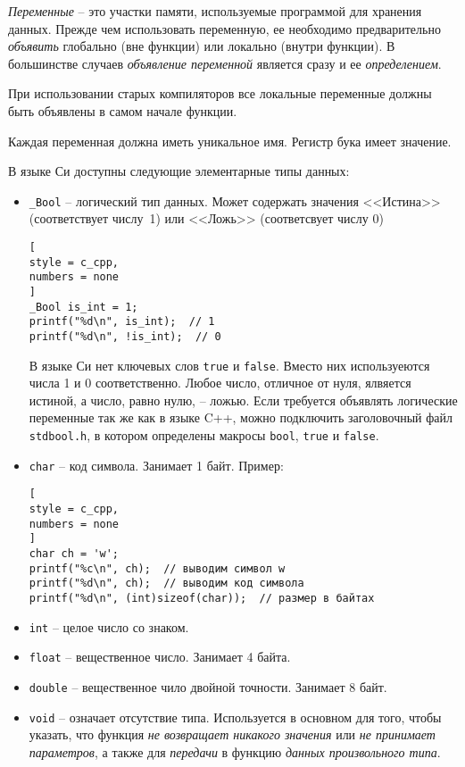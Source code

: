 \documentclass[%
	11pt,
	a4paper,
	utf8,
		]{article}
\begin{document}
\emph{Переменные} -- это участки памяти, используемые программой для хранения данных. Прежде чем использовать переменную, ее необходимо предварительно \emph{объявить} глобально (вне функции) или локально (внутри функции). В большинстве случаев \emph{объявление переменной} является сразу и ее \emph{определением}.

При использовании старых компиляторов все локальные переменные должны быть объявлены в самом начале функции.

Каждая переменная должна иметь уникальное имя. Регистр бука имеет значение.

В языке Си доступны следующие элементарные типы данных:
\begin{itemize}
	\item \verb*|_Bool| -- логический тип данных. Может содержать значения <<Истина>> (соответствует числу~1) или <<Ложь>> (соответсвует числу 0)
\begin{lstlisting}[
style = c_cpp,
numbers = none
]
_Bool is_int = 1;
printf("%d\n", is_int);  // 1
printf("%d\n", !is_int);  // 0
\end{lstlisting}

В языке Си нет ключевых слов \verb|true| и \verb|false|. Вместо них используеются числа 1 и 0 соответственно. Любое число, отличное от нуля, ялвяется истиной, а число, равно нулю, -- ложью. Если требуется объявлять логические переменные так же как в языке C++, можно подключить заголовочный файл \verb|stdbool.h|, в котором определены макросы \verb*|bool|, \verb*|true| и \verb|false|.

\item \verb*|char| -- код символа. Занимает 1 байт. Пример:
\begin{lstlisting}[
style = c_cpp,
numbers = none
]
char ch = 'w';
printf("%c\n", ch);  // выводим символ w
printf("%d\n", ch);  // выводим код символа
printf("%d\n", (int)sizeof(char));  // размер в байтах
\end{lstlisting}

\item \verb|int| -- целое число со знаком.

\item \verb*|float| -- вещественное число. Занимает 4 байта.

\item \verb*|double| -- вещественное чило двойной точности. Занимает 8 байт.

\item \verb|void| -- означает отсутствие типа. Используется в основном для того, чтобы указать, что функция \emph{не возвращает никакого значения} или \emph{не принимает параметров}, а также для \emph{передачи} в функцию \emph{данных произвольного типа}.
\end{itemize}
\end{document}
